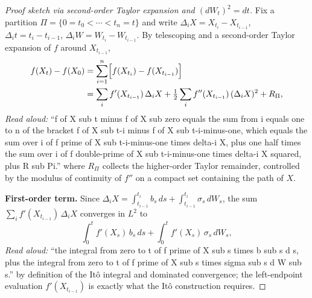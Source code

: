 \documentclass[11pt]{article}
\begin{document}
\begin{proof}[Proof sketch via second-order Taylor expansion and $(dW_t)^2 = dt$]
Fix a partition $\Pi = \{0 = t_0 < \cdots < t_n = t\}$ and write $\Delta_i X = X_{t_i} - X_{t_{i-1}}$,
$\Delta_i t = t_i - t_{i-1}$, $\Delta_i W = W_{t_i} - W_{t_{i-1}}$. By telescoping and a
second-order Taylor expansion of $f$ around $X_{t_{i-1}}$,
\begin{align*}
f(X_t) - f(X_0)
 &= \sum_{i=1}^n \Bigl[ f(X_{t_i}) - f(X_{t_{i-1}}) \Bigr] \\
 &= \sum_i f'(X_{t_{i-1}})\,\Delta_i X
   + \tfrac{1}{2}\sum_i f''(X_{t_{i-1}})\,(\Delta_i X)^2 + R_\Pi,
\end{align*}
\emph{Read aloud:} ``f of X sub t minus f of X sub zero equals the sum from i equals one to n of the bracket f of X sub t-i minus f of X sub t-i-minus-one, which equals the sum over i of f prime of X sub t-i-minus-one times delta-i X, plus one half times the sum over i of f double-prime of X sub t-i-minus-one times delta-i X squared, plus R sub Pi.''
where $R_\Pi$ collects the higher-order Taylor remainder, controlled by the modulus of continuity
of $f''$ on a compact set containing the path of $X$.

\smallskip\noindent\textbf{First-order term.}
Since $\Delta_i X = \int_{t_{i-1}}^{t_i} b_s\,ds + \int_{t_{i-1}}^{t_i} \sigma_s\,dW_s$,
the sum $\sum_i f'(X_{t_{i-1}})\,\Delta_i X$ converges in $L^2$ to
\[
\int_0^t f'(X_s)\,b_s\,ds + \int_0^t f'(X_s)\,\sigma_s\,dW_s,
\]
\emph{Read aloud:} ``the integral from zero to t of f prime of X sub s times b sub s d s, plus the integral from zero to t of f prime of X sub s times sigma sub s d W sub s.''
by definition of the It\^o integral and dominated convergence; the left-endpoint evaluation
$f'(X_{t_{i-1}})$ is exactly what the It\^o construction requires.


\end{proof}
\end{document}
